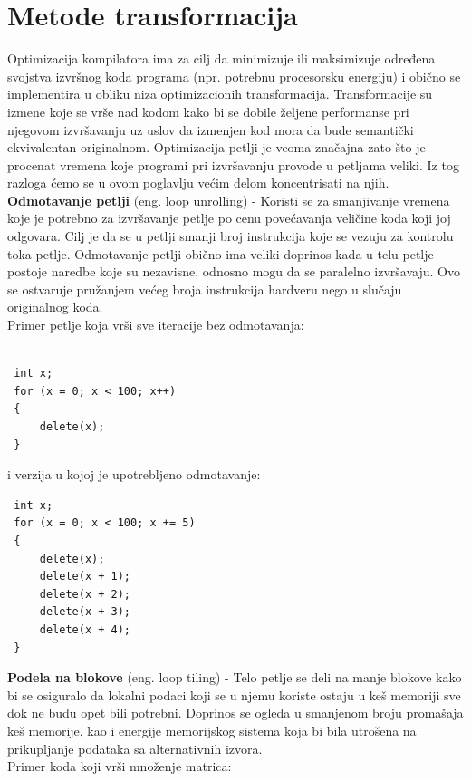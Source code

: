 \documentclass[a4paper]{article}
\begin{document}
\section{Metode transformacija}
\label{sec:transformacije}

Optimizacija kompilatora ima za cilj da minimizuje ili maksimizuje određena svojstva izvršnog koda programa (npr. potrebnu procesorsku energiju) i obično se implementira u obliku niza optimizacionih transformacija. Transformacije su izmene koje se vrše nad kodom kako bi se dobile željene performanse pri njegovom izvršavanju uz uslov da izmenjen kod mora da bude semantički ekvivalentan originalnom. Optimizacija petlji je veoma značajna zato što je procenat vremena koje programi pri izvršavanju provode u petljama veliki. Iz tog razloga ćemo se u ovom poglavlju većim delom koncentrisati na njih.  \\

\textbf{Odmotavanje petlji} (eng. loop unrolling) - Koristi se za smanjivanje vremena koje je potrebno za
izvršavanje petlje po cenu povećavanja veličine koda koji joj odgovara. Cilj je da se u petlji
smanji broj instrukcija koje se vezuju za kontrolu toka petlje. Odmotavanje petlji obično ima
veliki doprinos kada u telu petlje postoje naredbe koje su nezavisne, odnosno mogu da se
paralelno izvršavaju. Ovo se ostvaruje pružanjem većeg broja instrukcija hardveru nego u 
slučaju originalnog koda.\\
Primer petlje koja vrši sve iteracije bez odmotavanja:
\begin{lstlisting}

 int x;
 for (x = 0; x < 100; x++)
 {
     delete(x);
 }
\end{lstlisting}
i verzija u kojoj je upotrebljeno odmotavanje:
\begin{lstlisting}
 int x; 
 for (x = 0; x < 100; x += 5)
 {
     delete(x);
     delete(x + 1);
     delete(x + 2);
     delete(x + 3);
     delete(x + 4);
 }
\end{lstlisting}


\textbf{Podela na blokove} (eng. loop tiling) - Telo petlje se deli na manje blokove kako bi se osiguralo
da lokalni podaci koji se u njemu koriste ostaju u keš memoriji sve dok ne budu opet bili potrebni.
Doprinos se ogleda u smanjenom broju promašaja keš memorije, kao i energije memorijskog sistema koja
bi bila utrošena na prikupljanje podataka sa alternativnih izvora.\\
Primer koda koji vrši množenje matrica:
\end{document}
